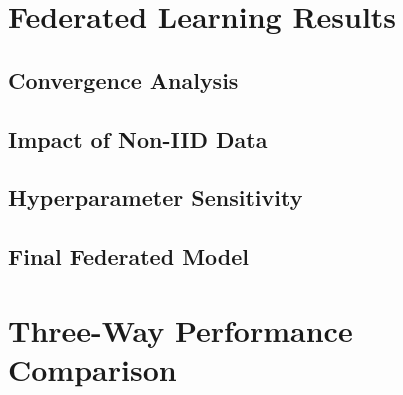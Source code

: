 \section{Federated Learning Results}
\label{sec:fl-results}

\subsection{Convergence Analysis}

\subsection{Impact of Non-IID Data}

\subsection{Hyperparameter Sensitivity}

\subsection{Final Federated Model}

\section{Three-Way Performance Comparison}
\label{sec:three-way-comparison}

